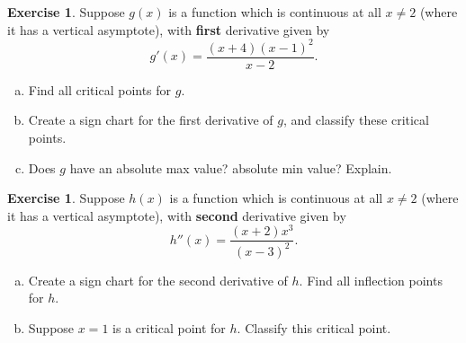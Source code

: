 \documentclass[11pt,reqno,final]{amsart}
\numberwithin{figure}{section}
\theoremstyle{definition} %
\newtheorem{exercise}[question]{Exercise}
\begin{document}
\newpage

\begin{exercise}
        Suppose $g(x)$ is a function which is continuous at all $x \neq 2$ (where it has a vertical asymptote), with \textbf{first} derivative given by
        \[
                g'(x) = \dfrac{(x+4)(x-1)^2}{x-2}.
        \]
        \begin{enumerate}[(a)]
        \item Find all critical points for $g$.
                \vfill
                \vfill
        \item Create a sign chart for the first derivative of $g$, and classify these critical points.
                \vfill
                \vfill
        \item Does $g$ have an absolute max value? absolute min value? Explain.
                \vfill
                \vfill
        \end{enumerate}
\end{exercise}


\begin{exercise}
        Suppose $h(x)$ is a function which is continuous at all $x \neq 2$ (where it has a vertical asymptote), with \textbf{second} derivative given by
        \[
                h''(x) = \dfrac{(x+2)x^3}{(x-3)^2}.
        \]
        \begin{enumerate}[(a)]
        \item Create a sign chart for the second derivative of $h$. Find all inflection points for $h$.
                \vfill
                \vfill
        \item Suppose $x = 1$ is a critical point for $h$. Classify this critical point.
                \vfill
        \end{enumerate}
\end{exercise}
\end{document}
